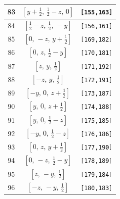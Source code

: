 \documentclass[fleqn,8pt]{jsarticle}
\begin{document}
\begin{longtable}{ccc}
83 & $\left[ y + \frac{1}{2},\, \frac{1}{2} - z,\, 0 \right]$ & {\tt [155,163]} \\ \hline
84 & $\left[ \frac{1}{2} - z,\, \frac{1}{2},\, - y \right]$ & {\tt [156,161]} \\ \hline
85 & $\left[ 0,\, - z,\, y + \frac{1}{2} \right]$ & {\tt [169,182]} \\ \hline
86 & $\left[ 0,\, z,\, \frac{1}{2} - y \right]$ & {\tt [170,181]} \\ \hline
87 & $\left[ z,\, y,\, \frac{1}{2} \right]$ & {\tt [171,192]} \\ \hline
88 & $\left[ - z,\, y,\, \frac{1}{2} \right]$ & {\tt [172,191]} \\ \hline
89 & $\left[ - y,\, 0,\, z + \frac{1}{2} \right]$ & {\tt [173,187]} \\ \hline
90 & $\left[ y,\, 0,\, z + \frac{1}{2} \right]$ & {\tt [174,188]} \\ \hline
91 & $\left[ y,\, 0,\, \frac{1}{2} - z \right]$ & {\tt [175,185]} \\ \hline
92 & $\left[ - y,\, 0,\, \frac{1}{2} - z \right]$ & {\tt [176,186]} \\ \hline
93 & $\left[ 0,\, z,\, y + \frac{1}{2} \right]$ & {\tt [177,190]} \\ \hline
94 & $\left[ 0,\, - z,\, \frac{1}{2} - y \right]$ & {\tt [178,189]} \\ \hline
95 & $\left[ z,\, - y,\, \frac{1}{2} \right]$ & {\tt [179,184]} \\ \hline
96 & $\left[ - z,\, - y,\, \frac{1}{2} \right]$ & {\tt [180,183]} \\
\end{longtable}
\renewcommand{\arraystretch}{1.2}
\end{document}
